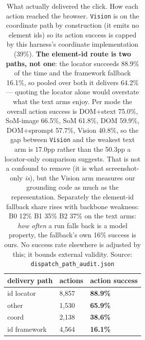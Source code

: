 \begin{table}[tp]
\centering
\caption{What actually delivered the click. How each action reached the browser. \texttt{Vision} is on the coordinate path by construction (it emits no element ids) so its action success is capped by this harness's coordinate implementation (39\%). \textbf{The element-id route is two paths, not one}: the locator succeeds 88.9\% of the time and the framework fallback 16.1\%, so pooled over both it delivers 64.2\% --- quoting the locator alone would overstate what the text arms enjoy. Per mode the overall action success is DOM+stext 75.0\%, SoM-image 66.5\%, SoM 61.8\%, DOM 59.9\%, DOM+sprompt 57.7\%, Vision 40.8\%, so the gap between \texttt{Vision} and the weakest text arm is 17.0pp rather than the 50.3pp a locator-only comparison suggests. That is not a confound to remove (it is what screenshot-only \emph{is}), but the Vision arm measures our grounding code as much as the representation. Separately the element-id fallback share rises with backbone weakness: B0 12\% \textperiodcentered{} B1 35\% \textperiodcentered{} B2 37\% on the text arms: \emph{how often} a run falls back is a model property, the fallback's own 16\% success is ours. No success rate elsewhere is adjusted by this; it bounds external validity. Source: \texttt{dispatch\_path\_audit.json}}
\label{tab:t13}
\footnotesize
\setlength{\tabcolsep}{3pt}
\begin{tabular}{@{}lll@{}}
\toprule
delivery path & actions & action success \\
\midrule
id locator & 8,857 & \textbf{88.9\%} \\
other & 1,530 & \textbf{65.9\%} \\
coord & 2,138 & \textbf{38.6\%} \\
id framework & 4,564 & \textbf{16.1\%} \\
\bottomrule
\end{tabular}
\end{table}
